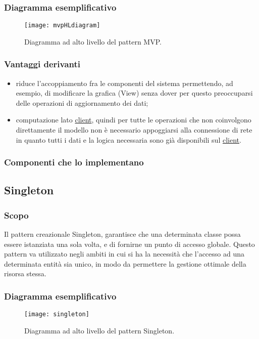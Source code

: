 \subsubsection{Diagramma esemplificativo}
\begin{figure}[h]
\centering
\texttt{[image: mvpHLdiagram]}
\caption{Diagramma ad alto livello del pattern MVP.}\label{fig:mvpHL}
\end{figure}


\subsubsection{Vantaggi derivanti}
\begin{itemize}
\item riduce l'accoppiamento fra le componenti del sistema permettendo, ad esempio, di modificare la grafica (View) senza dover per questo preoccuparsi delle operazioni di aggiornamento dei dati;
\item computazione lato \underline{client}, quindi per tutte le operazioni che non coinvolgono direttamente il modello non è necessario appoggiarsi alla connessione di rete in quanto tutti i dati e la logica necessaria sono già disponibili sul \underline{client}.
\end{itemize}

\subsubsection{Componenti che lo implementano}

\subsection{Singleton}

\subsubsection{Scopo}
Il pattern creazionale Singleton, garantisce che una determinata classe possa essere istanziata una sola volta, e di fornirne un punto di accesso globale. Questo pattern va utilizzato negli ambiti in cui si ha la necessità che l'accesso ad una determinata entità sia unico, in modo da permettere la gestione ottimale della risorsa stessa.

\subsubsection{Diagramma esemplificativo}
\begin{figure}[h]
\centering
\texttt{[image: singleton]}
\caption{Diagramma ad alto livello del pattern Singleton.}\label{fig:singleton}
\end{figure}

